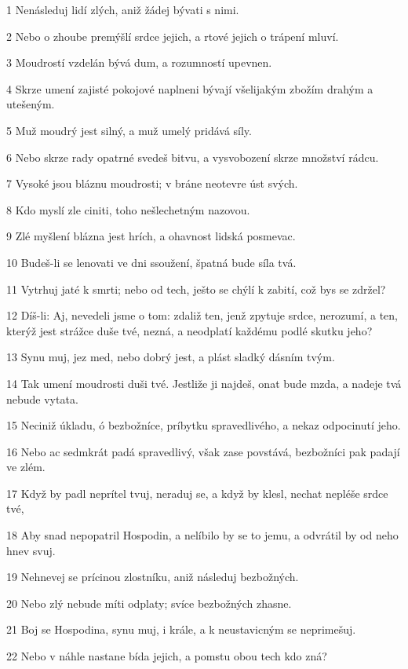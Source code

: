 \par 1 Nenásleduj lidí zlých, aniž žádej bývati s nimi.
\par 2 Nebo o zhoube premýšlí srdce jejich, a rtové jejich o trápení mluví.
\par 3 Moudrostí vzdelán bývá dum, a rozumností upevnen.
\par 4 Skrze umení zajisté pokojové naplneni bývají všelijakým zbožím drahým a utešeným.
\par 5 Muž moudrý jest silný, a muž umelý pridává síly.
\par 6 Nebo skrze rady opatrné svedeš bitvu, a vysvobození skrze množství rádcu.
\par 7 Vysoké jsou bláznu moudrosti; v bráne neotevre úst svých.
\par 8 Kdo myslí zle ciniti, toho nešlechetným nazovou.
\par 9 Zlé myšlení blázna jest hrích, a ohavnost lidská posmevac.
\par 10 Budeš-li se lenovati ve dni ssoužení, špatná bude síla tvá.
\par 11 Vytrhuj jaté k smrti; nebo od tech, ješto se chýlí k zabití, což bys se zdržel?
\par 12 Díš-li: Aj, nevedeli jsme o tom: zdaliž ten, jenž zpytuje srdce, nerozumí, a ten, kterýž jest strážce duše tvé, nezná, a neodplatí každému podlé skutku jeho?
\par 13 Synu muj, jez med, nebo dobrý jest, a plást sladký dásním tvým.
\par 14 Tak umení moudrosti duši tvé. Jestliže ji najdeš, onat bude mzda, a nadeje tvá nebude vytata.
\par 15 Neciniž úkladu, ó bezbožníce, príbytku spravedlivého, a nekaz odpocinutí jeho.
\par 16 Nebo ac sedmkrát padá spravedlivý, však zase povstává, bezbožníci pak padají ve zlém.
\par 17 Když by padl neprítel tvuj, neraduj se, a když by klesl, nechat nepléše srdce tvé,
\par 18 Aby snad nepopatril Hospodin, a nelíbilo by se to jemu, a odvrátil by od neho hnev svuj.
\par 19 Nehnevej se prícinou zlostníku, aniž následuj bezbožných.
\par 20 Nebo zlý nebude míti odplaty; svíce bezbožných zhasne.
\par 21 Boj se Hospodina, synu muj, i krále, a k neustavicným se neprimešuj.
\par 22 Nebo v náhle nastane bída jejich, a pomstu obou tech kdo zná?
